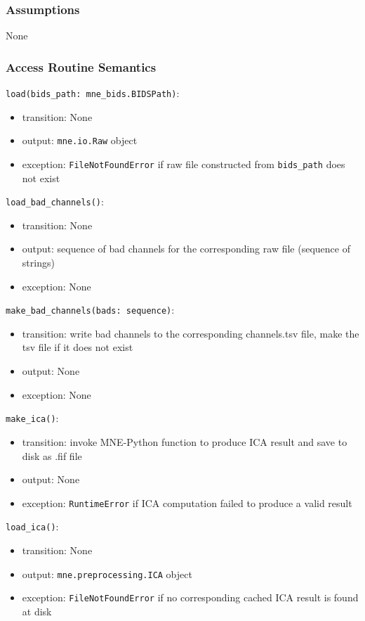 \documentclass[12pt, titlepage]{article}
\begin{document}
\subsubsection{Assumptions}


None




\subsubsection{Access Routine Semantics}


\noindent \lstinline|load(bids_path: mne_bids.BIDSPath)|:
\begin{itemize}
    \item transition: None
    \item output: \lstinline|mne.io.Raw| object
    \item exception: \lstinline|FileNotFoundError| if raw file constructed from \lstinline|bids_path| does not exist
\end{itemize}


\noindent \lstinline|load_bad_channels()|:
\begin{itemize}
    \item transition: None
    \item output: sequence of bad channels for the corresponding raw file (sequence of strings)
    \item exception: None
\end{itemize}


\noindent \lstinline|make_bad_channels(bads: sequence)|:
\begin{itemize}
    \item transition: write bad channels to the corresponding channels.tsv file, make the tsv file if it does not exist
    \item output: None
    \item exception: None
\end{itemize}


\noindent \lstinline|make_ica()|:
\begin{itemize}
    \item transition: invoke MNE-Python function to produce ICA result and save to disk as .fif file
    \item output: None
    \item exception: \lstinline|RuntimeError| if ICA computation failed to produce a valid result
\end{itemize}


\noindent \lstinline|load_ica()|:
\begin{itemize}
    \item transition: None
    \item output: \lstinline|mne.preprocessing.ICA| object
    \item exception: \lstinline|FileNotFoundError| if no corresponding cached ICA result is found at disk
\end{itemize}
\end{document}
